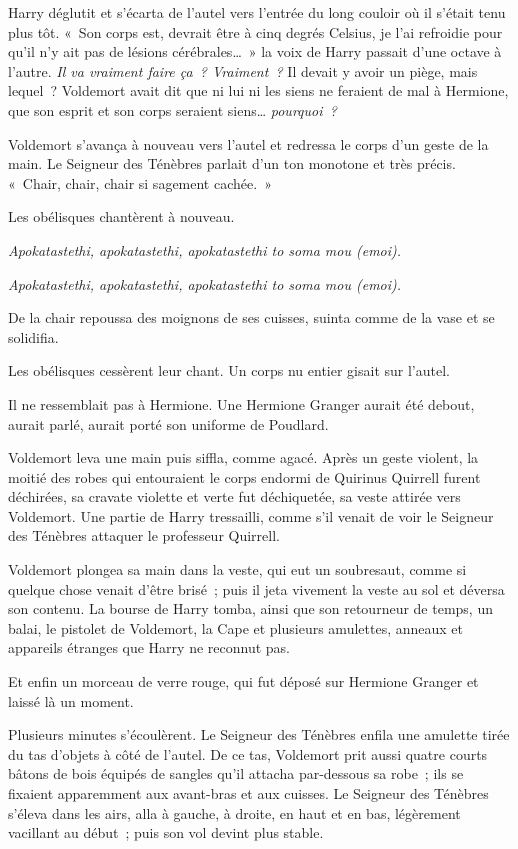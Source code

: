 Harry déglutit et s'écarta de l'autel vers l'entrée du long couloir où il s'était tenu plus tôt.
«~Son corps est, devrait être à cinq degrés Celsius, je l'ai refroidie pour qu'il n'y ait pas de lésions cérébrales…~»
la voix de Harry passait d'une octave à l'autre.
\emph{Il va vraiment faire ça~?
Vraiment~?} Il devait y avoir un piège, mais lequel~?
Voldemort avait dit que ni lui ni les siens ne feraient de mal à Hermione, que son esprit et son corps seraient siens…
\emph{pourquoi~?}

Voldemort s'avança à nouveau vers l'autel et redressa le corps d'un geste de la main.
Le Seigneur des Ténèbres parlait d'un ton monotone et très précis.
«~Chair, chair, chair si sagement cachée.~»

Les obélisques chantèrent à nouveau.

\emph{Apokatastethi, apokatastethi, apokatastethi to soma mou (emoi).}

\emph{Apokatastethi, apokatastethi, apokatastethi to soma mou (emoi).}

De la chair repoussa des moignons de ses cuisses, suinta comme de la vase et se solidifia.

Les obélisques cessèrent leur chant.
Un corps nu entier gisait sur l'autel.

Il ne ressemblait pas à Hermione.
Une Hermione Granger aurait été debout, aurait parlé, aurait porté son uniforme de Poudlard.

Voldemort leva une main puis siffla, comme agacé.
Après un geste violent, la moitié des robes qui entouraient le corps endormi de Quirinus Quirrell furent déchirées, sa cravate violette et verte fut déchiquetée, sa veste attirée vers Voldemort.
Une partie de Harry tressailli, comme s'il venait de voir le Seigneur des Ténèbres attaquer le professeur Quirrell.

Voldemort plongea sa main dans la veste, qui eut un soubresaut, comme si quelque chose venait d'être brisé~; puis il jeta vivement la veste au sol et déversa son contenu.
La bourse de Harry tomba, ainsi que son retourneur de temps, un balai, le pistolet de Voldemort, la Cape et plusieurs amulettes, anneaux et appareils étranges que Harry ne reconnut pas.

Et enfin un morceau de verre rouge, qui fut déposé sur Hermione Granger et laissé là un moment.

Plusieurs minutes s'écoulèrent.
Le Seigneur des Ténèbres enfila une amulette tirée du tas d'objets à côté de l'autel.
De ce tas, Voldemort prit aussi quatre courts bâtons de bois équipés de sangles qu'il attacha par-dessous sa robe~; ils se fixaient apparemment aux avant-bras et aux cuisses.
Le Seigneur des Ténèbres s'éleva dans les airs, alla à gauche, à droite, en haut et en bas, légèrement vacillant au début~; puis son vol devint plus stable.

